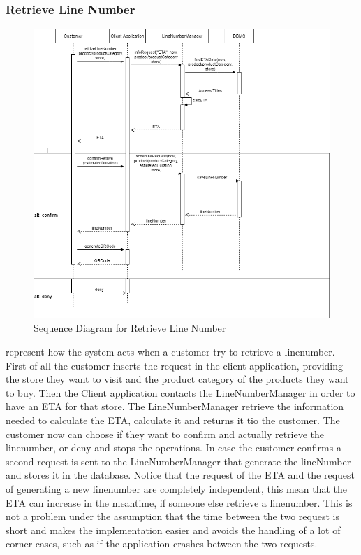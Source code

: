 \subsubsection{Retrieve Line Number}
\begin{figure}[H]
    \centering
    \includegraphics[height=0.4\textwidth]{Images/CustomerSequenceDiagrams/RetriveLineNumberSequenceDiagram.png}
    \caption{Sequence Diagram for Retrieve Line Number}
    \label{fig:SDRetrieveLineNumber}
\end{figure}
 represent how the system acts when a customer try to retrieve a linenumber.
First of all the customer inserts the request in the client application, providing the store they want to visit and the product category of the products they want to buy.
Then the Client application contacts the LineNumberManager in order to have an ETA for that store.
The LineNumberManager retrieve the information needed to calculate the ETA, calculate it and returns it tio the customer.
The customer now can choose if they want to confirm and actually retrieve the linenumber, or deny and stops the operations.
In case the customer confirms a second request is sent to the LineNumberManager that generate the lineNumber and stores it in the database.
Notice that the request of the ETA and the request of generating a new linenumber are completely independent, this mean that the ETA can increase in the meantime, if someone else retrieve a linenumber.
This is not a problem under the assumption that the time between the two request is short and makes the implementation easier and avoids the handling of a lot of corner cases, such as if the application crashes between the two requests.


